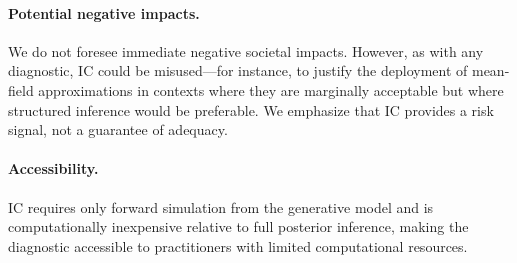 \documentclass[10pt]{article} %
\theoremstyle{plain}
\theoremstyle{definition}
\begin{document}
\paragraph{Potential negative impacts.} We do not foresee immediate negative societal impacts. However, as with any diagnostic, IC could be misused---for instance, to justify the deployment of mean-field approximations in contexts where they are marginally acceptable but where structured inference would be preferable. We emphasize that IC provides a risk signal, not a guarantee of adequacy.

\paragraph{Accessibility.} IC requires only forward simulation from the generative model and is computationally inexpensive relative to full posterior inference, making the diagnostic accessible to practitioners with limited computational resources.


\end{document}
